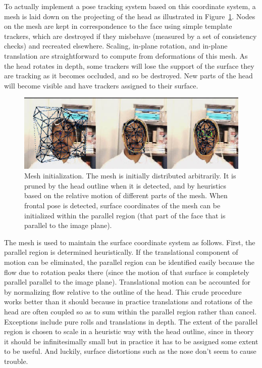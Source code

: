 To actually implement a pose tracking system based on this coordinate
system, a mesh is laid down on the projecting of the head as
illustrated in Figure~\ref{fig:mesh-init}.  Nodes on the mesh are kept
in correspondence to the face using simple template trackers, which
are destroyed if they misbehave (measured by a set of consistency
checks) and recreated elsewhere.  Scaling, in-plane rotation, and
in-plane translation are straightforward to compute from deformations
of this mesh.  As the head rotates in depth, some trackers will lose
the support of the surface they are tracking as it becomes occluded,
and so be destroyed.  New parts of the head will become visible and
have trackers assigned to their surface.

\begin{figure}[tbp]
\centerline{
\includegraphics[width=\columnwidth]{mesh-dark-init.eps}
}
\caption{ 
%
Mesh initialization.
The mesh is initially distributed arbitrarily.  It is pruned by the
head outline when it is detected, and by heuristics based on the
relative motion of different parts of the mesh.  When frontal pose is
detected, surface coordinates of the mesh can be initialized within
the parallel region (that part of the face that is parallel to the
image plane).
%
}
\label{fig:mesh-init}
\end{figure}

The mesh is used to maintain the surface coordinate system as follows.
First, the parallel region is determined heuristically.  If the
translational component of motion can be eliminated, the parallel
region can be identified easily because the flow due to rotation peaks
there (since the motion of that surface is completely parallel
parallel to the image plane).  Translational motion can be accounted
for by normalizing flow relative to the outline of the head.  This
crude procedure works better than it should because in practice
translations and rotations of the head are often coupled so as to sum
within the parallel region rather than cancel.  Exceptions include
pure rolls and translations in depth.  The extent of the parallel
region is chosen to scale in a heuristic way with the head outline,
since in theory it should be infinitesimally small but in practice it
has to be assigned some extent to be useful.  And luckily, surface
distortions such as the nose don't seem to cause trouble.

